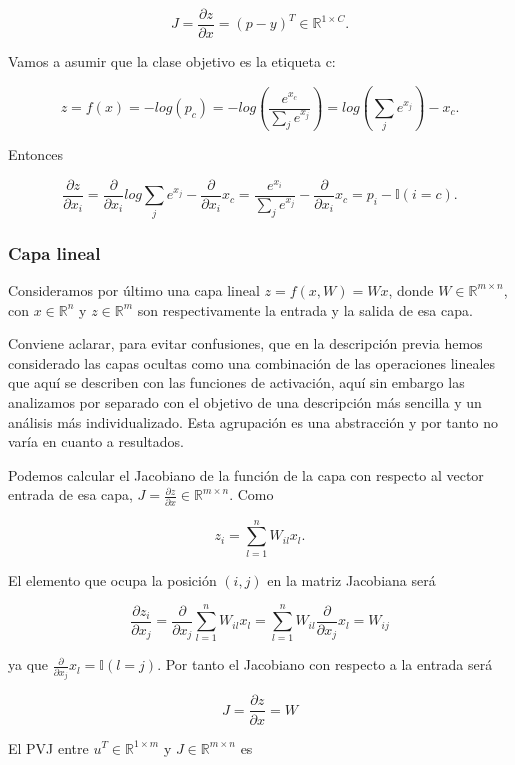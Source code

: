 $$J= \frac{\partial z}{\partial x}= (p-y)^T \in \mathbb{R}^{1\times C}.$$

Vamos a asumir que la clase objetivo es la etiqueta c:

$$z=f(x)=-log(p_c)=-log \left (\frac{e^{x_c}}{\sum_j e^{x_j}} \right ) = log \left ( \sum_j e^{x_j} \right ) - x_c.$$

Entonces

$$\frac{\partial z}{\partial x_i} = \frac{\partial}{\partial x_i} log \sum_j e^{x_j} - \frac{\partial}{\partial x_i}x_c = \frac{e^{x_i}}{\sum_j e^{x_j}} - \frac{\partial}{\partial x_i}x_c = p_i - \mathbb{I}(i=c).$$

\subsubsection{Capa lineal}



Consideramos por último una capa lineal $z=f(x,W)=Wx$, donde $W \in \mathbb{R}^{m \times n}$, con $x \in \mathbb{R}^n$ y $z \in \mathbb{R}^m$ son respectivamente la entrada y la salida de esa capa.

Conviene aclarar, para evitar confusiones, que en la descripción previa hemos considerado las capas ocultas como una combinación de las operaciones lineales que aquí se describen con las funciones de activación, aquí sin embargo las analizamos por separado con el objetivo de una descripción más sencilla y un análisis más individualizado. Esta agrupación es una abstracción y por tanto no varía en cuanto a resultados.


Podemos calcular el Jacobiano de la función de la capa con respecto al vector entrada de esa capa, $J=\frac{\partial z}{\partial x} \in \mathbb{R}^{m \times n}$. Como

$$z_i = \sum_{l=1}^n W_{il}x_l.$$

El elemento que ocupa la posición $(i,j)$ en la matriz Jacobiana será 

$$\frac{\partial z_i}{\partial x_j} = \frac{\partial}{\partial x_j} \sum_{l=1}^n W_{il} x_l = \sum_{l=1}^n W_{il} \frac{\partial}{\partial x_j} x_l = W_{ij}$$

ya que $\frac{\partial}{\partial x_j} x_l= \mathbb{I} (l=j)$. Por tanto el Jacobiano con respecto a la entrada será

$$J=\frac{\partial z}{\partial x}=W$$

El PVJ entre $u^T \in \mathbb{R}^{1 \times m}$ y $J \in \mathbb{R}^{m \times n}$ es


